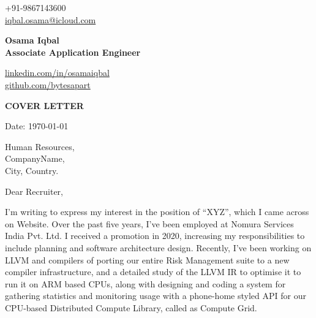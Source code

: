 \documentclass[11pt,a4paper]{article}
\begin{document}

\begin{center}
    \begin{minipage}[b]{0.24\textwidth}
            \large +91-9867143600 \\
            \large \href{mailto:iqbal.osama@icloud.com}{iqbal.osama@icloud.com} 
    \end{minipage}%
    \begin{minipage}[b]{0.5\textwidth}
            \centering
            {\Huge \textbf{Osama Iqbal}} \\ 
            \vspace{0.1cm}
            {\color{CarianBlue}\Large{\textbf{Associate Application Engineer}}}
    \end{minipage}%
    \begin{minipage}[b]{0.28\textwidth}
            \flushright \large
            {\href{https://www.linkedin.com/in/osamaiqbal/}{linkedin.com/in/osamaiqbal} } \\
            \href{https://github.com/bytesapart}{github.com/bytesapart}
    \end{minipage}   
    
\vspace{-0.15cm} 
{\color{CarianBlue} \hrulefill}
\end{center}

\justify
\setlength{\parindent}{0pt}
\setlength{\parskip}{12pt}
\vspace{0.2cm}
\begin{center}
  {\color{CarianBlue} \Large{\textbf{COVER LETTER}}}
\end{center}


Date: \today \par \vspace{-0.1cm}

Human Resources, \\
CompanyName, \\
City, Country.


Dear Recruiter,  %

I'm writing to express my interest in the position of “XYZ”, which I came across on Website. Over the past five years, I've been employed at Nomura Services India Pvt. Ltd. I received a promotion in 2020, increasing my responsibilities to include planning and software architecture design. Recently, I've been working on LLVM and compilers of porting our entire Risk Management suite to a new compiler infrastructure, and a detailed study of the LLVM IR to optimise it to run it on ARM based CPUs, along with designing and coding a system for gathering statistics and monitoring usage with a phone-home styled API for our CPU-based Distributed Compute Library, called as Compute Grid. \par
 
\end{document}
